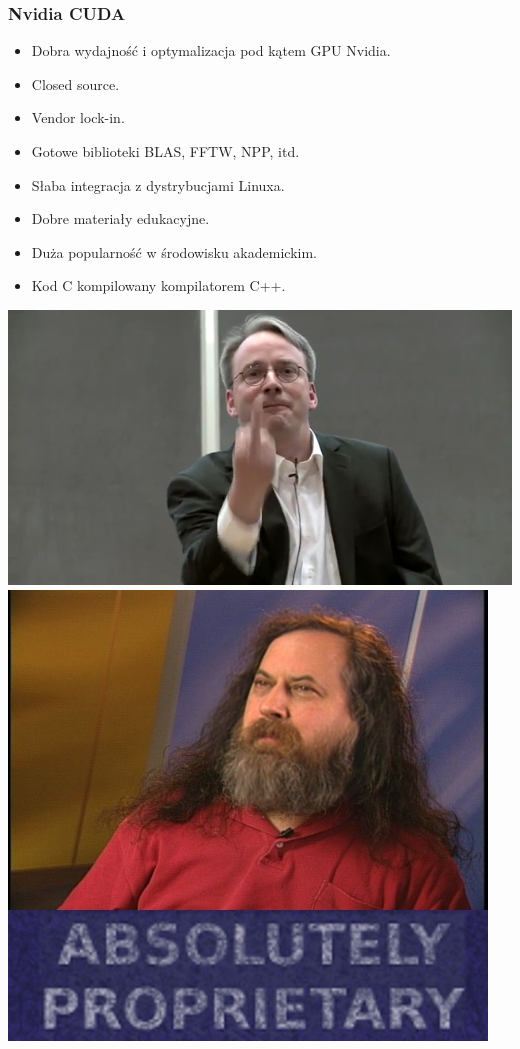 \documentclass[dvipsnames,table]{beamer}
\begin{document}
\begin{frame}
	\frametitle{Nvidia CUDA}
\begin{itemize}
	\item Dobra wydajność i optymalizacja pod kątem GPU Nvidia.
	\item Closed source.
	\item Vendor lock-in.
	\item Gotowe biblioteki BLAS, FFTW, NPP, itd.
	\item Słaba integracja z dystrybucjami Linuxa.
	\item Dobre materiały edukacyjne.
	\item Duża popularność w środowisku akademickim.
	\item Kod C kompilowany kompilatorem C++. \Annoey
\end{itemize}
\begin{center}
\includegraphics[scale=0.25]{img-torvalds.png}
\includegraphics[scale=0.19]{img-stallman.jpg}
\end{center}


\end{frame}
\end{document}
